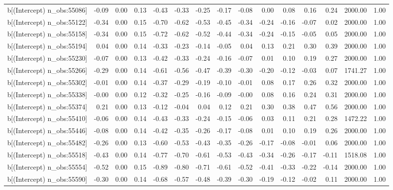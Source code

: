 \begin{table}[ht]
\begin{tabular}{rrrrrrrrrrrrrrr}
  b[(Intercept) n\_obs:55086] & -0.09 & 0.00 & 0.13 & -0.43 & -0.33 & -0.25 & -0.17 & -0.08 & 0.00 & 0.08 & 0.16 & 0.24 & 2000.00 & 1.00 \\ 
  b[(Intercept) n\_obs:55122] & -0.34 & 0.00 & 0.15 & -0.70 & -0.62 & -0.53 & -0.45 & -0.34 & -0.24 & -0.16 & -0.07 & 0.02 & 2000.00 & 1.00 \\ 
  b[(Intercept) n\_obs:55158] & -0.34 & 0.00 & 0.15 & -0.72 & -0.62 & -0.52 & -0.44 & -0.34 & -0.24 & -0.15 & -0.05 & 0.05 & 2000.00 & 1.00 \\ 
  b[(Intercept) n\_obs:55194] & 0.04 & 0.00 & 0.14 & -0.33 & -0.23 & -0.14 & -0.05 & 0.04 & 0.13 & 0.21 & 0.30 & 0.39 & 2000.00 & 1.00 \\ 
  b[(Intercept) n\_obs:55230] & -0.07 & 0.00 & 0.13 & -0.42 & -0.33 & -0.24 & -0.16 & -0.07 & 0.01 & 0.10 & 0.19 & 0.27 & 2000.00 & 1.00 \\ 
  b[(Intercept) n\_obs:55266] & -0.29 & 0.00 & 0.14 & -0.61 & -0.56 & -0.47 & -0.39 & -0.30 & -0.20 & -0.12 & -0.03 & 0.07 & 1741.27 & 1.00 \\ 
  b[(Intercept) n\_obs:55302] & -0.01 & 0.00 & 0.14 & -0.37 & -0.29 & -0.19 & -0.10 & -0.01 & 0.08 & 0.17 & 0.26 & 0.32 & 2000.00 & 1.00 \\ 
  b[(Intercept) n\_obs:55338] & -0.00 & 0.00 & 0.12 & -0.32 & -0.25 & -0.16 & -0.09 & -0.00 & 0.08 & 0.16 & 0.24 & 0.31 & 2000.00 & 1.00 \\ 
  b[(Intercept) n\_obs:55374] & 0.21 & 0.00 & 0.13 & -0.12 & -0.04 & 0.04 & 0.12 & 0.21 & 0.30 & 0.38 & 0.47 & 0.56 & 2000.00 & 1.00 \\ 
  b[(Intercept) n\_obs:55410] & -0.06 & 0.00 & 0.14 & -0.43 & -0.33 & -0.24 & -0.15 & -0.06 & 0.03 & 0.11 & 0.21 & 0.28 & 1472.22 & 1.00 \\ 
  b[(Intercept) n\_obs:55446] & -0.08 & 0.00 & 0.14 & -0.42 & -0.35 & -0.26 & -0.17 & -0.08 & 0.01 & 0.10 & 0.19 & 0.26 & 2000.00 & 1.00 \\ 
  b[(Intercept) n\_obs:55482] & -0.26 & 0.00 & 0.13 & -0.60 & -0.53 & -0.43 & -0.35 & -0.26 & -0.17 & -0.08 & -0.01 & 0.06 & 2000.00 & 1.00 \\ 
  b[(Intercept) n\_obs:55518] & -0.43 & 0.00 & 0.14 & -0.77 & -0.70 & -0.61 & -0.53 & -0.43 & -0.34 & -0.26 & -0.17 & -0.11 & 1518.08 & 1.00 \\ 
  b[(Intercept) n\_obs:55554] & -0.52 & 0.00 & 0.15 & -0.89 & -0.80 & -0.71 & -0.61 & -0.52 & -0.41 & -0.33 & -0.22 & -0.14 & 2000.00 & 1.00 \\ 
  b[(Intercept) n\_obs:55590] & -0.30 & 0.00 & 0.14 & -0.68 & -0.57 & -0.48 & -0.39 & -0.30 & -0.19 & -0.12 & -0.02 & 0.11 & 2000.00 & 1.00 \\ 

\end{tabular}
\end{table}
